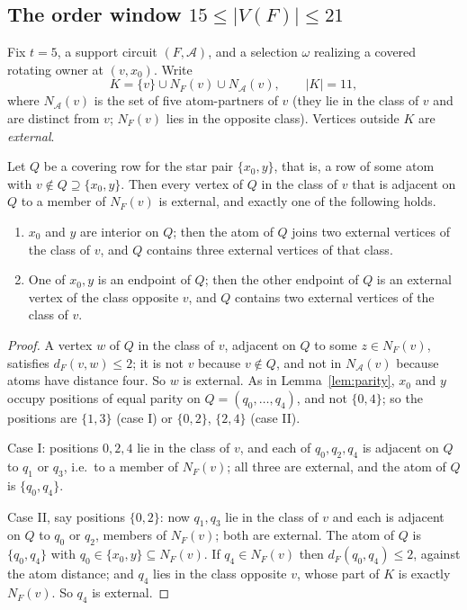 \subsection{The order window \texorpdfstring{\(15\le|V(F)|\le21\)}{15..21}}

Fix \(t=5\), a support circuit \((F,\mathcal A)\), and a selection
\(\omega\) realizing a covered rotating owner at \((v,x_0)\). Write
\[
K=\{v\}\cup N_F(v)\cup N_{\mathcal A}(v),\qquad |K|=11,
\]
where \(N_{\mathcal A}(v)\) is the set of five atom-partners of
\(v\) (they lie in the class of \(v\) and are distinct from \(v\);
\(N_F(v)\) lies in the opposite class). Vertices outside \(K\) are
\emph{external}.

\begin{lemma}\label{lem:trichotomy}
Let \(Q\) be a covering row for the star pair \(\{x_0,y\}\), that is,
a row of some atom with \(v\notin Q\supseteq\{x_0,y\}\). Then every
vertex of \(Q\) in the class of \(v\) that is adjacent on \(Q\) to a
member of \(N_F(v)\) is external, and exactly one of the following
holds.
\begin{enumerate}[label=\textup{(\Roman*)}]
\item \(x_0\) and \(y\) are interior on \(Q\); then the atom of \(Q\)
joins two external vertices of the class of \(v\), and \(Q\) contains
three external vertices of that class.
\item One of \(x_0,y\) is an endpoint of \(Q\); then the other
endpoint of \(Q\) is an external vertex of the class opposite \(v\),
and \(Q\) contains two external vertices of the class of \(v\).
\end{enumerate}
\end{lemma}

\begin{proof}
A vertex \(w\) of \(Q\) in the class of \(v\), adjacent on \(Q\) to
some \(z\in N_F(v)\), satisfies \(d_F(v,w)\le2\); it is not \(v\)
because \(v\notin Q\), and not in \(N_{\mathcal A}(v)\) because atoms
have distance four. So \(w\) is external. As in
Lemma~\ref{lem:parity}, \(x_0\) and \(y\) occupy positions of equal
parity on \(Q=(q_0,\dots,q_4)\), and not \(\{0,4\}\); so the positions
are \(\{1,3\}\) (case I) or \(\{0,2\}\), \(\{2,4\}\) (case II).

Case I: positions \(0,2,4\) lie in the class of \(v\), and each of
\(q_0,q_2,q_4\) is adjacent on \(Q\) to \(q_1\) or \(q_3\), i.e.\ to a
member of \(N_F(v)\); all three are external, and the atom of \(Q\) is
\(\{q_0,q_4\}\).

Case II, say positions \(\{0,2\}\): now \(q_1,q_3\) lie in the class
of \(v\) and each is adjacent on \(Q\) to \(q_0\) or \(q_2\), members
of \(N_F(v)\); both are external. The atom of \(Q\) is
\(\{q_0,q_4\}\) with \(q_0\in\{x_0,y\}\subseteq N_F(v)\). If \(q_4\in
N_F(v)\) then \(d_F(q_0,q_4)\le2\), against the atom distance; and
\(q_4\) lies in the class opposite \(v\), whose part of \(K\) is
exactly \(N_F(v)\). So \(q_4\) is external.
\end{proof}

